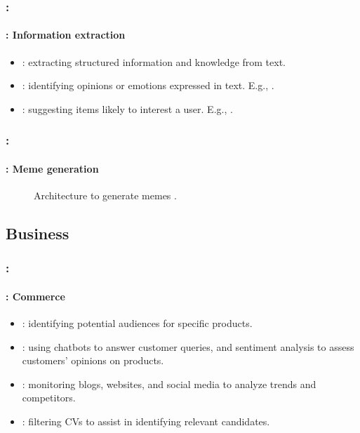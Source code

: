\documentclass[xcolor=table]{beamer}
\begin{document}
\begin{frame}
	\frametitle{\insertshortsubtitle: \insertsection}
	\framesubtitle{\insertsubsection: Information extraction}

	\begin{itemize}
		\item {}: extracting structured information and knowledge from text.
		\item {}: identifying opinions or emotions expressed in text.
		E.g., .
		\item {}: suggesting items likely to interest a user.
		E.g., .
	\end{itemize}

\end{frame}

\begin{frame}
	\frametitle{\insertshortsubtitle: \insertsection}
	\framesubtitle{\insertsubsection: Meme generation}

	\begin{figure}
		\centering
		\caption{Architecture to generate memes \cite{sadasivam2020memebot}.}
	\end{figure}

\end{frame}


\subsection{Business}

\begin{frame}
	\frametitle{\insertshortsubtitle: \insertsection}
	\framesubtitle{\insertsubsection: Commerce}

	\begin{itemize}
		\item {}: identifying potential audiences for specific products.
		
		\item {}: using chatbots to answer customer queries, and sentiment analysis to assess customers' opinions on products.
		
		\item {}: monitoring blogs, websites, and social media to analyze trends and competitors.
		
		\item {}: filtering CVs to assist in identifying relevant candidates.
	\end{itemize}

\end{frame}
\end{document}
